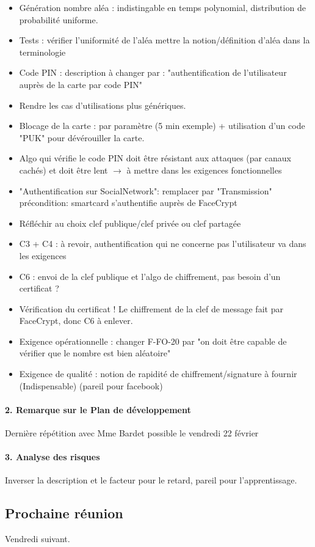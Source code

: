 \documentclass[a4paper,10pt]{article}
\begin{document}
\begin{itemize}
    \item Génération nombre aléa : indistingable en temps polynomial, 
    distribution de probabilité uniforme.
    \item Tests : vérifier l'uniformité de l'aléa mettre la notion/définition 
d'aléa dans la terminologie
    \item Code PIN : description à changer par : "authentification de 
    l'utilisateur auprès de la carte par code PIN"
    \item Rendre les cas d'utilisations plus génériques.
    \item Blocage de la carte : par paramètre (5 min exemple) + 
    utilisation d'un code "PUK" pour dévérouiller la carte.
    \item Algo qui vérifie le code PIN doit être résistant aux attaques (par 
            canaux cachés) et doit être lent $\rightarrow$ à mettre dans les exigences 
        fonctionnelles
    \item "Authentification sur SocialNetwork":  remplacer par "Transmission"
précondition:  smartcard s'authentifie auprès de FaceCrypt
    \item Réfléchir au choix clef publique/clef privée ou clef partagée 
    \item C3 + C4 : à revoir, authentification qui ne concerne pas 
    l'utilisateur va dans les exigences
    \item C6 : envoi de la clef publique et l'algo de chiffrement, pas besoin
    d'un certificat ?
    \item Vérification du certificat ! Le chiffrement de la clef de message 
    fait par FaceCrypt, donc C6 à enlever.
    \item Exigence opérationnelle : changer F-FO-20 par "on doit être capable 
    de vérifier que le nombre est bien aléatoire"
    \item Exigence de qualité : notion de rapidité de chiffrement/signature à 
fournir (Indispensable) (pareil pour facebook)
\end{itemize}


\paragraph{2. Remarque sur le Plan de développement}
Dernière répétition avec Mme Bardet possible le vendredi 22 février

\paragraph{3. Analyse des risques}
Inverser la description et le facteur pour le retard, pareil pour 
l'apprentissage.

\subsection*{Prochaine réunion}
    Vendredi suivant.    
\end{document}
